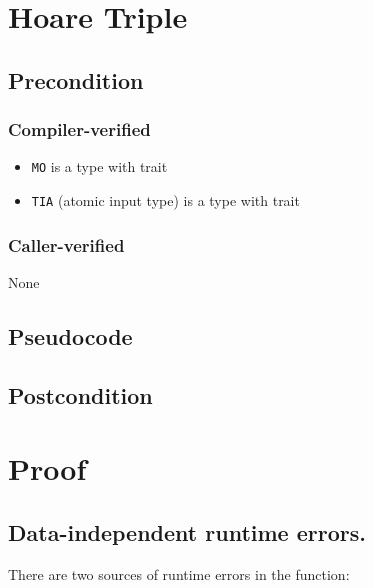 \documentclass{article}
\begin{document}
\section{Hoare Triple} 
\subsection*{Precondition} 
\subsubsection*{Compiler-verified}
\begin{itemize} 
    \item \texttt{MO} is a type with trait 
    \item \texttt{TIA} (atomic input type) is a type with trait 
\end{itemize} 

\subsubsection*{Caller-verified}
None
 
\subsection*{Pseudocode} 
\label{sec:python-pseudocode} 
 
 
\subsection*{Postcondition} 
 
\begin{theorem}
    \label{postcondition}
\end{theorem}
 
\section{Proof} 

\subsection{Data-independent runtime errors.}
There are two sources of runtime errors in the function:
\end{document}
